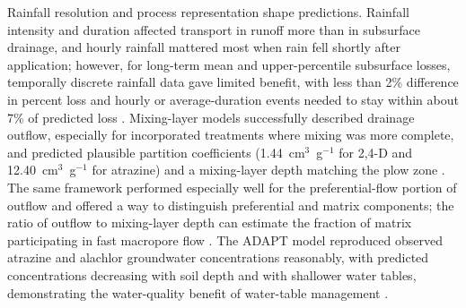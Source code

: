 \documentclass[11pt]{article}
\begin{document}
Rainfall resolution and process representation shape predictions. Rainfall intensity and duration affected transport in runoff more than in subsurface drainage, and hourly rainfall mattered most when rain fell shortly after application; however, for long-term mean and upper-percentile subsurface losses, temporally discrete rainfall data gave limited benefit, with less than 2\% difference in percent loss and hourly or average-duration events needed to stay within about 7\% of predicted loss \parencite{Fox2007}. Mixing-layer models successfully described drainage outflow, especially for incorporated treatments where mixing was more complete, and predicted plausible partition coefficients (1.44~cm$^3$~g$^{-1}$ for 2,4-D and 12.40~cm$^3$~g$^{-1}$ for atrazine) and a mixing-layer depth matching the plow zone \parencite{Shalit1996}. The same framework performed especially well for the preferential-flow portion of outflow and offered a way to distinguish preferential and matrix components; the ratio of outflow to mixing-layer depth can estimate the fraction of matrix participating in fast macropore flow \parencite{SHALIT1995,Shalit1996}. The ADAPT model reproduced observed atrazine and alachlor groundwater concentrations reasonably, with predicted concentrations decreasing with soil depth and with shallower water tables, demonstrating the water-quality benefit of water-table management \parencite{Kalita1998}.
\end{document}
